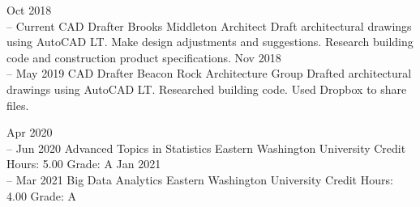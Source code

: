 \documentclass[11pt]{developercv} %
\newcommand{\vsp}{\vspace{-10pt}}
\begin{document}
\vsp



\begin{entrylist}
	\entry
		{Oct 2018 \\
		-- Current}
		{CAD Drafter}
		{Brooks Middleton Architect}
		{Draft architectural drawings using AutoCAD LT. Make design adjustments and suggestions. Research building code and construction product specifications.}
	\entry
		{Nov 2018 \\
		-- May 2019}
		{CAD Drafter}
		{Beacon Rock Architecture Group}
		{Drafted architectural drawings using AutoCAD LT. Researched building code. Used Dropbox to share files.}
\end{entrylist}

\vsp



\begin{entrylist}
	\entry
		{Apr 2020 \\
		-- Jun 2020}
		{Advanced Topics in Statistics}
		{Eastern Washington University}
		{Credit Hours: 5.00 \hspace{100pt} Grade: A}
	\entry
		{Jan 2021 \\
		-- Mar 2021}
		{Big Data Analytics}
		{Eastern Washington University}
		{Credit Hours: 4.00 \hspace{100pt} Grade: A}
\end{entrylist}
\end{document}
